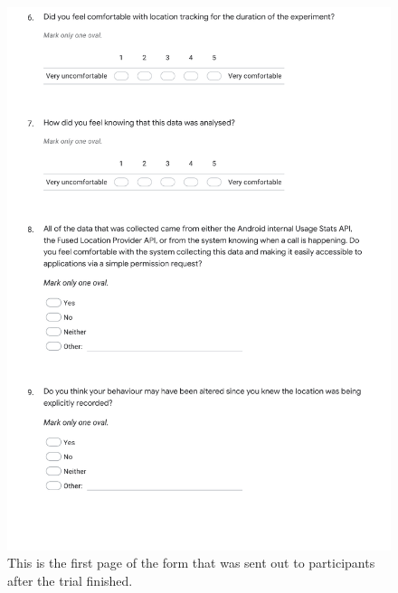 \documentclass{l4proj}
\begin{document}
\begin{appendices}
\begin{figure}[htb]
    \includegraphics[width=\textwidth]{images/device_form_2.pdf}
    \caption{This is the first page of the form that was sent out to participants after the trial finished.}
    \label{fig:device_form2}
\end{figure}


\end{appendices}
\end{document}
